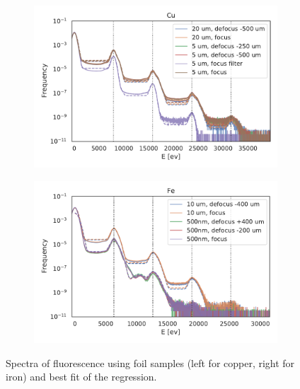 \begin{figure}[h!]
	\centering
	\begin{subfigure}[b]{0.45\textwidth}
		\includegraphics[width=\linewidth]{images/spectrum_foil_cu.pdf}
	\end{subfigure}
	\begin{subfigure}[b]{0.45\textwidth}
		\includegraphics[width=\linewidth]{images/spectrum_foil_fe.pdf}
	\end{subfigure}
	\caption[Spectra of fluorescence using foil samples ]{Spectra of fluorescence using foil samples (left for copper, right for iron) and best fit of the regression.}
	\label{fig:spectrafoil}
\end{figure}

